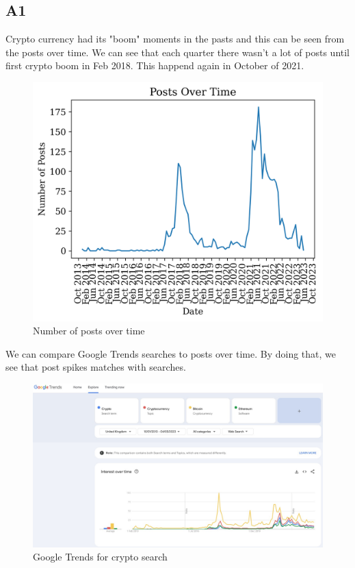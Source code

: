 \subsection{A1}\label{A1}

Crypto currency had its "boom" moments in the pasts and this can be seen from the posts over time. We can see that each quarter there wasn't a lot of posts until first crypto boom in Feb 2018. This happend again in October of 2021.

\begin{figure}[H]
\includegraphics[scale=1]{img/A1/created_utc_timeseries.png}
\centering
\caption{Number of posts over time}
\label{fig:created_utc_timeseries}
\end{figure}

\begin{landscape}
We can compare Google Trends \parencite{web:GoogleTrends} searches to posts over time. By doing that, we see that post spikes matches with searches.
\begin{figure}[H]
\includegraphics[scale=0.42]{img/A1/GoogleTrends.jpg}
\centering
\caption{Google Trends for crypto search}
\label{fig:GoogleTrends}
\end{figure}
\end{landscape}


